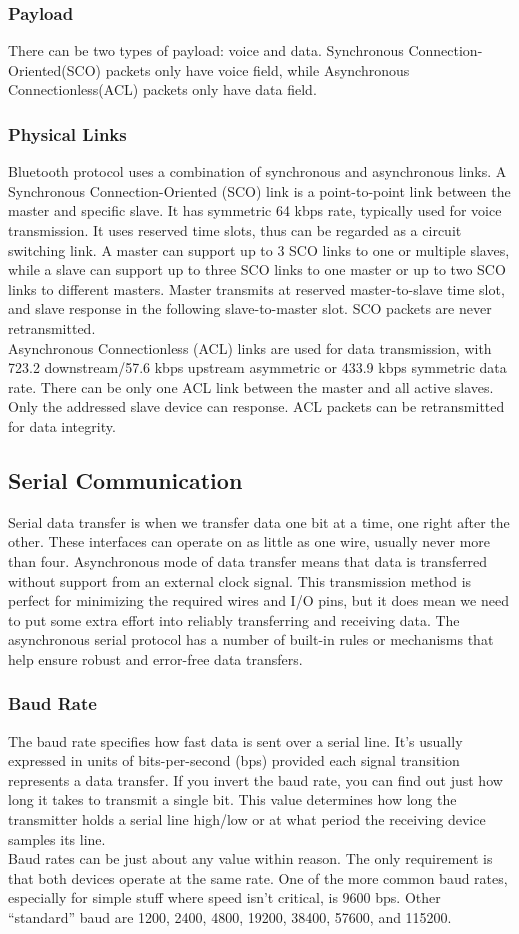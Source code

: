 \subsubsection*{Payload}
There can be two types of payload: voice and data. Synchronous Connection-Oriented(SCO) packets only have voice field, while Asynchronous Connectionless(ACL) packets only have data field.
\subsubsection{Physical Links}
Bluetooth protocol uses a combination of synchronous and asynchronous links. A Synchronous Connection-Oriented (SCO) link is a point-to-point link between the master and specific slave. It has symmetric 64 kbps rate, typically used for voice transmission. It uses reserved time slots, thus can be regarded as a circuit switching link. A master can support up to 3 SCO links to one or multiple slaves, while a slave can support up to three SCO links to one master or up to two SCO links to different masters. Master transmits at reserved master-to-slave time slot, and slave response in the following slave-to-master slot. SCO packets are never retransmitted.\\
Asynchronous Connectionless (ACL) links are used for data transmission, with 723.2 downstream/57.6 kbps upstream asymmetric or 433.9 kbps symmetric data rate. There can be only one ACL link between the master and all active slaves. Only the addressed slave device can response. ACL packets can be retransmitted for data integrity.
\subsection{Serial Communication}
Serial data transfer is when we transfer data one bit at a time, one right after the other. These
interfaces can operate on as little as one wire, usually never more than four.
Asynchronous mode of data transfer means that data is transferred without support from an
external clock signal. This transmission method is perfect for minimizing the required wires
and I/O pins, but it does mean we need to put some extra effort into reliably transferring and
receiving data. The asynchronous serial protocol has a number of built-in rules or
mechanisms that help ensure robust and error-free data transfers.
\subsubsection{Baud Rate}
The baud rate specifies how fast data is sent over a serial line. It’s usually expressed in units
of bits-per-second (bps) provided each signal transition represents a data transfer. If you
invert the baud rate, you can find out just how long it takes to transmit a single bit. This
value determines how long the transmitter holds a serial line high/low or at what period the
receiving device samples its line.\\
Baud rates can be just about any value within reason. The only requirement is that both
devices operate at the same rate. One of the more common baud rates, especially for simple
stuff where speed isn’t critical, is 9600 bps. Other “standard” baud are 1200, 2400, 4800,
19200, 38400, 57600, and 115200.
